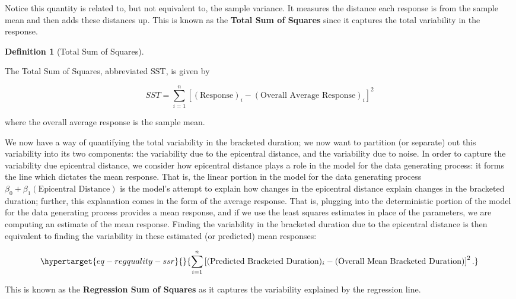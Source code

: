 \documentclass[
  letterpaper,
  DIV=11,
  numbers=noendperiod]{scrreprt}
\theoremstyle{plain}
\theoremstyle{definition}
\theoremstyle{definition}
\newtheorem{definition}{Definition}[chapter]
\theoremstyle{remark}
\begin{document}
Notice this quantity is related to, but not equivalent to, the sample
variance. It measures the distance each response is from the sample mean
and then adds these distances up. This is known as the \textbf{Total Sum
of Squares} since it captures the total variability in the response.

\begin{definition}[Total Sum of
Squares]\protect\hypertarget{def-sst}{}\label{def-sst}

The Total Sum of Squares, abbreviated SST, is given by

\[SST = \sum_{i=1}^{n} \left[(\text{Response})_i - (\text{Overall Average Response})_i\right]^2\]

where the overall average response is the sample mean.

\end{definition}

We now have a way of quantifying the total variability in the bracketed
duration; we now want to partition (or separate) out this variability
into its two components: the variability due to the epicentral distance,
and the variability due to noise. In order to capture the variability
due epicentral distance, we consider how epicentral distance plays a
role in the model for the data generating process: it forms the line
which dictates the mean response. That is, the linear portion in the
model for the data generating process
\(\beta_0 + \beta_1 (\text{Epicentral Distance})\) is the model's
attempt to explain how changes in the epicentral distance explain
changes in the bracketed duration; further, this explanation comes in
the form of the average response. That is, plugging into the
deterministic portion of the model for the data generating process
provides a mean response, and if we use the least squares estimates in
place of the parameters, we are computing an estimate of the mean
response. Finding the variability in the bracketed duration due to the
epicentral distance is then equivalent to finding the variability in
these estimated (or predicted) mean responses:

\begin{equation}\protect\hypertarget{eq-regquality-ssr}{}{\sum_{i=1}^{n} \left[(\text{Predicted Bracketed Duration})_i - (\text{Overall Mean Bracketed Duration})\right]^2.}\label{eq-regquality-ssr}\end{equation}

This is known as the \textbf{Regression Sum of Squares} as it captures
the variability explained by the regression line.
\end{document}
